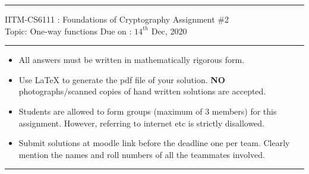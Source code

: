 \documentclass[11pt]{exam}
\begin{document}

\hrule
\vspace{3mm}
\noindent
{\sf IITM-CS6111 : Foundations of Cryptography  \hfill Assignment \#2 }
\vspace{3mm} \\
\noindent
{\sf Topic: One-way functions \hfill Due on : $14^{th}$ Dec, 2020}
\vspace{3mm}
\hrule

{\small 
\begin{itemize}
\itemsep 0pt
\item All answers must be written in mathematically rigorous form.
\item Use LaTeX to generate the pdf file of your solution. \textbf{NO} photographs/scanned copies of hand written solutions are accepted. 
\item Students are allowed to form groups (maximum of $3$ members) for this assignment. However, referring to internet etc is strictly disallowed.
\item Submit solutions at moodle link before the deadline one per team. Clearly mention the names and roll numbers of all the teammates involved.
\end{itemize}
}


\hrule
\end{document}
